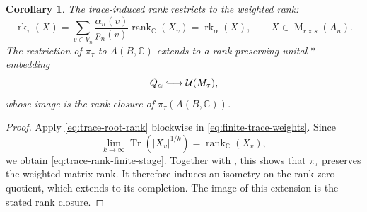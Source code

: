 \documentclass[11pt]{amsart}
\DeclareMathOperator{\rk}{rk}
\DeclareMathOperator{\Mat}{M}
\newtheorem{corollary}[theorem]{Corollary}
\theoremstyle{definition}
\theoremstyle{remark}
\begin{document}
\begin{corollary}\label{prop:trace-induced-rank}
The trace-induced rank restricts to the weighted rank:
\begin{equation}\label{eq:trace-rank-finite-stage}
 \rk_\tau(X)=\sum_{v\in V_n}\frac{\alpha_n(v)}{p_n(v)}
                  \operatorname{rank}_{\mathbb C}(X_v)
 =\rk_\alpha(X),\qquad X\in\Mat_{r\times s}(A_n).
\end{equation}
The restriction of $\pi_\tau$ to $A(B,\mathbb C)$ extends to a
rank-preserving unital $*$-embedding
\begin{equation}\label{eq:core-affiliated-embedding}
 Q_\alpha\lhook\joinrel\longrightarrow\mathcal U(M_\tau),
\end{equation}
whose image is the rank closure of $\pi_\tau(A(B,\mathbb C))$.
\end{corollary}

\begin{proof}
Apply \eqref{eq:trace-root-rank} blockwise in
\eqref{eq:finite-trace-weights}.  Since
\[
 \lim_{k\to\infty}\operatorname{Tr}(|X_v|^{1/k})
 =\operatorname{rank}_{\mathbb C}(X_v),
\]
we obtain \eqref{eq:trace-rank-finite-stage}.
Together with , this shows that
$\pi_\tau$ preserves the weighted matrix rank.
It therefore induces an isometry
on the rank-zero quotient, which extends to its completion.
The image of this extension is the stated rank closure.
\end{proof}
\end{document}
